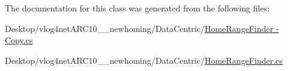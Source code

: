 The documentation for this class was generated from the following files\-:\begin{DoxyCompactItemize}
\item 
Desktop/vlog4net\-A\-R\-C10\-\_\-\_\-newhoming/\-Data\-Centric/\hyperlink{_home_range_finder_01-_01_copy_8cs}{Home\-Range\-Finder -\/ Copy.\-cs}\item 
Desktop/vlog4net\-A\-R\-C10\-\_\-\_\-newhoming/\-Data\-Centric/\hyperlink{_home_range_finder_8cs}{Home\-Range\-Finder.\-cs}\end{DoxyCompactItemize}
